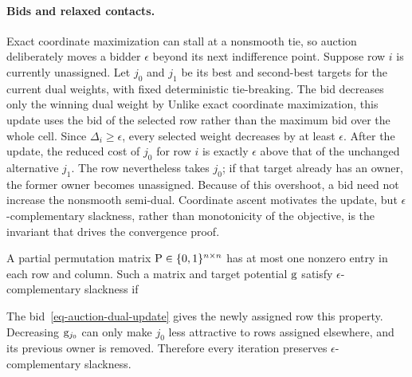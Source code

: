 \paragraph{Bids and relaxed contacts.}
Exact coordinate maximization can stall at a nonsmooth tie, so auction deliberately moves a bidder $\epsilon$ beyond its next indifference point.
Suppose row $i$ is currently unassigned. Let $j_0$ and $j_1$ be its best and second-best targets for the current dual weights,
with fixed deterministic tie-breaking. The bid decreases only the winning dual weight by
Unlike exact coordinate maximization, this update uses the bid of the selected row rather than the maximum bid over the whole cell. Since $\Delta_i\geq\epsilon$, every selected weight decreases by at least $\epsilon$. After the update, the reduced cost of $j_0$ for row $i$ is exactly $\epsilon$ above that of the unchanged alternative $j_1$. The row nevertheless takes $j_0$; if that target already has an owner, the former owner becomes unassigned. Because of this overshoot, a bid need not increase the nonsmooth semi-dual. Coordinate ascent motivates the update, but $\epsilon$-complementary slackness, rather than monotonicity of the objective, is the invariant that drives the convergence proof.

\begin{defn}\label{def-auction-eps-cs}
	A partial permutation matrix $\P\in\{0,1\}^{n\times n}$ has at most one nonzero entry in each row and column. Such a matrix and target potential $\gD$ satisfy $\epsilon$-complementary slackness if
\end{defn}
The bid~\eqref{eq-auction-dual-update} gives the newly assigned row this property. Decreasing $\gD_{j_0}$ can only make $j_0$ less attractive to rows assigned elsewhere, and its previous owner is removed. Therefore every iteration preserves $\epsilon$-complementary slackness.

